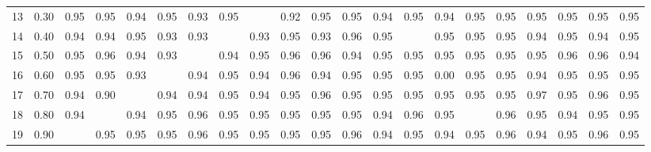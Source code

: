 \begin{table}[ht]
\begin{tabular}{rrrrrrrrrrrrrrrrrrrrr}
  13 & 0.30 & 0.95 & 0.95 & 0.94 & 0.95 & 0.93 & 0.95 &  & 0.92 & 0.95 & 0.95 & 0.94 & 0.95 & 0.94 & 0.95 & 0.95 & 0.95 & 0.95 & 0.95 & 0.95 \\ 
  14 & 0.40 & 0.94 & 0.94 & 0.95 & 0.93 & 0.93 &  & 0.93 & 0.95 & 0.93 & 0.96 & 0.95 &  & 0.95 & 0.95 & 0.95 & 0.94 & 0.95 & 0.94 & 0.95 \\ 
  15 & 0.50 & 0.95 & 0.96 & 0.94 & 0.93 &  & 0.94 & 0.95 & 0.96 & 0.96 & 0.94 & 0.95 & 0.95 & 0.95 & 0.95 & 0.95 & 0.95 & 0.96 & 0.96 & 0.94 \\ 
  16 & 0.60 & 0.95 & 0.95 & 0.93 &  & 0.94 & 0.95 & 0.94 & 0.96 & 0.94 & 0.95 & 0.95 & 0.95 & 0.00 & 0.95 & 0.95 & 0.94 & 0.95 & 0.95 & 0.95 \\ 
  17 & 0.70 & 0.94 & 0.90 &  & 0.94 & 0.94 & 0.95 & 0.94 & 0.95 & 0.96 & 0.95 & 0.95 & 0.95 & 0.95 & 0.95 & 0.95 & 0.97 & 0.95 & 0.96 & 0.95 \\ 
  18 & 0.80 & 0.94 &  & 0.94 & 0.95 & 0.96 & 0.95 & 0.95 & 0.95 & 0.95 & 0.95 & 0.94 & 0.96 & 0.95 &  & 0.96 & 0.95 & 0.94 & 0.95 & 0.95 \\ 
  19 & 0.90 &  & 0.95 & 0.95 & 0.95 & 0.96 & 0.95 & 0.95 & 0.95 & 0.95 & 0.96 & 0.94 & 0.95 & 0.94 & 0.95 & 0.96 & 0.94 & 0.95 & 0.96 & 0.95 \\ 
   \hline
\end{tabular}
\end{table}
